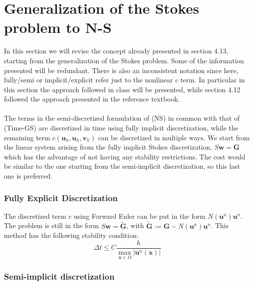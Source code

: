 \documentclass[11pt]{book}
\begin{document}
\section{Generalization of the Stokes problem to N-S}

In this section we will revise the concept already presented in section 4.13, starting from the generalization of the Stokes problem. Some of the information presented will be redundant. There is also an inconsistent notation since here, fully/semi or implicit/explicit refer just to the nonlinear $c$ term.  In particular in this section the approach followed in class will be presented, while section 4.12 followed the approach presented in the reference textbook.\\ \\
The terms in the semi-discretized formulation of (NS) in common with that of (Time-GS) are discretized in time using fully implicit discretization, while the remaining term $c(\mathbf{u}_{h}, \mathbf{u}_{h}, \mathbf{v}_{h})$ can be discretized in multiple ways.
We start from the linear system arising from the fully implicit Stokes discretization, $S\mathbf{w}=\mathbf{G}$ which has the advantage of not having any stability restrictions. The cost would be similar to the one starting from the semi-implicit discretization, so this last one is preferred.

\subsubsection*{Fully Explicit Discretization}


The discretized term $c$ using Forward Euler can be put in the form $N\left(\mathbf{u}^{n}\right) \mathbf{u}^{n}$. The problem is still in the form $S \mathbf{w}=\mathbf{\tilde{G}}$, with $\mathbf{\tilde{G}}:=\mathbf{G}-N\left(\mathbf{u}^{n}\right) \mathbf{u}^{n}$.
This method has the following stability condition:
\begin{equation}
\Delta t \leq C \frac{h}{\max _{\mathbf{x} \in \Omega}\left|\mathbf{u}^{n}(\mathbf{x})\right|}
\end{equation}

\subsubsection*{Semi-implicit discretization}
\end{document}
